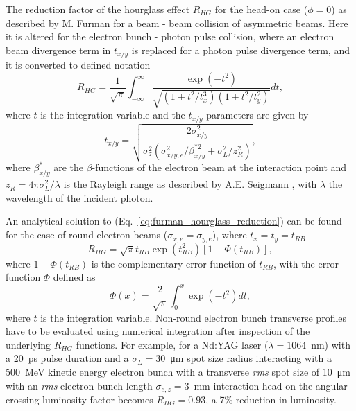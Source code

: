 \documentclass[../main.tex]{subfiles}
\begin{document}
The reduction factor of the hourglass effect $R_{HG}$ for the head-on case ($\phi = 0$) as described by M. Furman \cite{furman1991hourglass} for a beam - beam collision of asymmetric beams. Here it is altered for the electron bunch - photon pulse collision, where an electron beam divergence term in $t_{x/y}$ is replaced for a photon pulse divergence term, and it is converted to defined notation 
\begin{equation}
R_{HG} = \frac{1}{\sqrt{\pi}}\int_{-\infty}^{\infty}\frac{\exp\left(-t^{2}\right)}{\sqrt{\left(1+t^{2}/t_{x}^{3}\right)\left(1+t^{2}/t_{y}^{2}\right)}}dt,
\label{eq:furman_hourglass_reduction}    
\end{equation}
where $t$ is the integration variable and the $t_{x/y}$ parameters are given by
\begin{equation}
t_{x/y} = \sqrt{\frac{2\sigma_{x/y}^{2}}{\sigma_{z}^{2}\left(\sigma_{x/y,e}^{2}/\beta_{x/y}^{*2}+\sigma_{L}^{2}/z_{R}^{2}\right)}},
\label{eq:furman_txy_parameters}    
\end{equation}
where $\beta_{x/y}^{*}$ are the $\beta$-functions of the electron beam at the interaction point and $z_{R}=4\pi\sigma_{L}^{2}/\lambda$ is the Rayleigh range as described by A.E. Seigmann \cite{siegmann1986lasers}, with $\lambda$ the wavelength of the incident photon.

An analytical solution to (Eq.~\ref{eq:furman_hourglass_reduction}) can be found for the case of round electron beams ($\sigma_{x,e}=\sigma_{y,e}$), where $t_{x}=t_{y}=t_{RB}$
\begin{equation}
R_{HG} = \sqrt{\pi}t_{RB}\exp\left(t_{RB}^{2}\right)\left[1-\Phi\left(t_{RB}\right)\right],
\label{eq:furman_hourglass_reduction_analytical}    
\end{equation}
where $1-\Phi\left(t_{RB}\right)$ is the complementary error function of $t_{RB}$, with the error function $\Phi$ defined as
\begin{equation}
\Phi\left(x\right) = \frac{2}{\sqrt{\pi}}\int_{0}^{x}\exp\left(-t^{2}\right)dt,
\label{eq:error_function}    
\end{equation}
where $t$ is the integration variable. Non-round electron bunch transverse profiles have to be evaluated using numerical integration after inspection of the underlying $R_{HG}$ functions. For example, for a Nd:YAG laser ($\lambda = 1064$~\si{\nano\meter}) with a 20~\si{\pico\second} pulse duration and a $\sigma_{L} = 30$~\si{\micro\meter} spot size radius interacting with a 500~\si{\mega\electronvolt} kinetic energy electron bunch with a transverse \textit{rms} spot size of 10~\si{\micro\meter} with an \textit{rms} electron bunch length $\sigma_{e,z} = 3$~\si{\milli\meter} interaction head-on the angular crossing luminosity factor becomes $R_{HG} = 0.93$, a 7\% reduction in luminosity.
\end{document}

